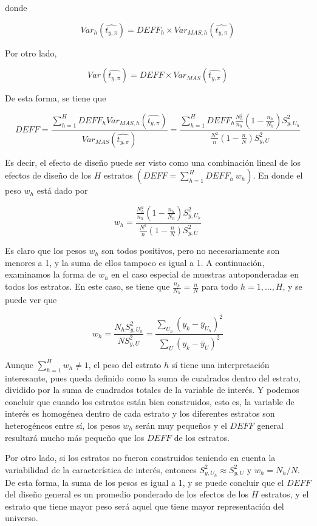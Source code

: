 \documentclass[
  12pt,
  spanish,
]{book}
\begin{document}
donde

\[
{Var}_h\left(\widehat{t_{y,\pi}}\right)={DEFF}_h \times {Var}_{MAS,h}\left(\widehat{t_{y,\pi}}\right)
\]

Por otro lado,

\[
Var\left(\widehat{t_{y,\pi}}\right)=DEFF \times {Var}_{MAS}\left(\widehat{t_{y,\pi}}\right)
\]

De esta forma, se tiene que

\[
DEFF=\frac{\sum_{h=1}^{H}DEFF_h{Var}_{MAS,h}\left(\widehat{t_{y,\pi}}\right)}{Var_{MAS}\left(\widehat{t_{y,\pi}}\right)}=\frac{\sum_{h=1}^{H}DEFF_h\frac{N_h^2}{n_h}(1-\frac{n_h}{N_h})S_{y,U_h}^2}{\frac{N^2}{n}(1-\frac{n}{N})S_{y,U}^2}
\]

Es decir, el efecto de diseño puede ser visto como una combinación lineal de los efectos de diseño de los \(H\) estratos \((DEFF=\sum_{h=1}^{H} DEFF_h \ w_h)\). En donde el peso \(w_h\) está dado por

\[
w_h=\frac{\frac{N_h^2}{n_h}(1-\frac{n_h}{N_h})S_{y,U_h}^2}{\frac{N^2}{n}(1-\frac{n}{N})S_{y,U}^2}
\]

Es claro que los pesos \(w_h\) son todos positivos, pero no necesariamente son menores a 1, y la suma de ellos tampoco es igual a 1. A continuación, examinamos la forma de \(w_h\) en el caso especial de muestras autoponderadas en todos los estratos. En este caso, se tiene que \(\frac{n_h}{N_h}=\frac{n}{N}\) para todo \(h=1,\ldots,H\), y se puede ver que

\[
w_h=\frac{N_hS_{y,U_h}^2}{NS_{y,U}^2}=\frac{\sum_{U_h}{(y_k-{\bar{y}}_{U_h})}^2}{\sum_{U}{(y_k-{\bar{y}}_U)}^2}
\]

Aunque \(\sum_{h=1}^{H}w_h\neq 1\), el peso del estrato \(h\) sí tiene una interpretación interesante, pues queda definido como la suma de cuadrados dentro del estrato, dividido por la suma de cuadrados totales de la variable de interés. Y podemos concluir que cuando los estratos están bien construidos, esto es, la variable de interés es homogénea dentro de cada estrato y los diferentes estratos son heterogéneos entre sí, los pesos \(w_h\) serán muy pequeños y el \(DEFF\) general resultará mucho más pequeño que los \(DEFF\) de los estratos.

Por otro lado, si los estratos no fueron construidos teniendo en cuenta la variabilidad de la característica de interés, entonces \(S_{y,U_h}^2\approx S_{y,U}^2\) y \(w_h=N_h/N\). De esta forma, la suma de los pesos es igual a 1, y se puede concluir que el \(DEFF\) del diseño general es un promedio ponderado de los efectos de los \(H\) estratos, y el estrato que tiene mayor peso será aquel que tiene mayor representación del universo.
\end{document}
